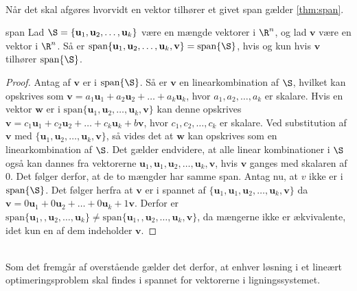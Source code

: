 \\
%
%
Når det skal afgøres hvorvidt en vektor tilhører et givet span gælder \ref{thm:span}.
%
\begin{thm}{}{span}
%
Lad $\S =  \{ \mathbf{u}_1, \mathbf{u}_2 , \ldots , \mathbf{u}_k \}$ være en mængde vektorer i $\R^n$, og lad $\mathbf{v}$ være en vektor i $\R^n$.
Så er $\text{span}\{ \mathbf{u}_1, \mathbf{u}_2 , \ldots , \mathbf{u}_k , \mathbf{v}\} =\text{span}\{\S\}$, hvis og kun hvis $\mathbf{v}$ tilhører $\text{span}\{\S\}$.
%
\end{thm}
%
%
\begin{proof}
%
Antag af $\mathbf{v}$ er i $\text{span}\{\S\}$. Så er $\mathbf{v}$ en linearkombination af $\S$, hvilket kan opskrives som $\mathbf{v}=a_1\mathbf{u}_1+a_2\mathbf{u}_2+ \ldots + a_k\mathbf{u}_k$, hvor $a_1,a_2,\ldots, a_k$ er skalare. 
Hvis en vektor $\mathbf{w}$ er i $\text{span}\{ \mathbf{u}_1, \mathbf{u}_2 , \ldots , \mathbf{u}_k , \mathbf{v}\}$ kan denne opskrives $\mathbf{v}=c_1\mathbf{u}_1+c_2\mathbf{u}_2+ \ldots + c_k\mathbf{u}_k+b\mathbf{v}$, hvor $c_1,c_2,\ldots, c_k$ er skalare.
Ved substitution af $\mathbf{v}$ med $\{ \mathbf{u}_1, \mathbf{u}_2 , \ldots , \mathbf{u}_k , \mathbf{v}\}$, så vides det at $\mathbf{w}$ kan opskrives som en linearkombination af $\S$. 
Det gælder endvidere, at alle linear kombinationer i $\S$ også kan dannes fra vektorerne $\mathbf{u}_1,\mathbf{u}_1, \mathbf{u}_2 , \ldots , \mathbf{u}_k , \mathbf{v}$, hvis $\mathbf{v}$ ganges med skalaren af $0$.
Det følger derfor, at de to mængder har samme span. 
Antag nu, at $v$ ikke er i $\text{span}\{\S\}$. 
Det følger herfra at $\mathbf{v}$ er i spannet af 
$\{ \mathbf{u}_1,\mathbf{u}_1, \mathbf{u}_2 , \ldots , \mathbf{u}_k , \mathbf{v}\}$ da 
$\mathbf{v}=0\mathbf{u}_1+0\mathbf{u}_2+ \ldots + 0\mathbf{u}_k+1\mathbf{v}$.
Derfor er
$\text{span}\{ \mathbf{u}_1,, \mathbf{u}_2 , \ldots , \mathbf{u}_k \}
\neq
\text{span}\{ \mathbf{u}_1,, \mathbf{u}_2 , \ldots , \mathbf{u}_k , \mathbf{v}\}$, 
da mængerne ikke er ækvivalente, idet kun en af dem indeholder $\mathbf{v}$. 
%
\end{proof}
\\
%
%
Som det fremgår af overstående gælder det derfor, at enhver løsning i et lineært optimeringsproblem skal findes i spannet for vektorerne i ligningssystemet. 
%